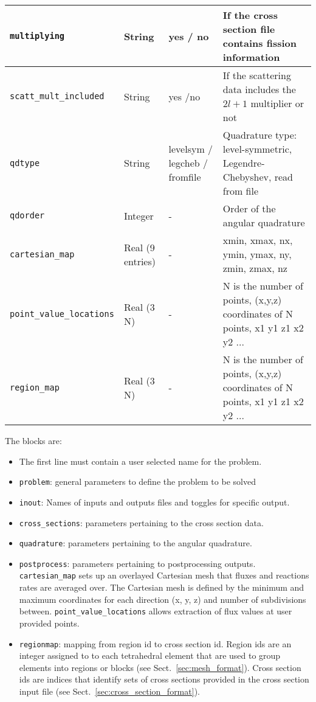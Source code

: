 \begin{longtable}[H]{l l l l}
    \verb"multiplying" & String & yes / no & If the cross section file contains fission information \\ \hline
    \verb"scatt_mult_included" & String & yes /no & If the scattering data includes the $2 l + 1$ multiplier or not \\ \hline
    \verb"qdtype" & String & levelsym / legcheb / fromfile & Quadrature type: level-symmetric, Legendre-Chebyshev, read from file \\ \hline
    \verb"qdorder" & Integer & - & Order of the angular quadrature \\ \hline
    \verb"cartesian_map" & Real (9 entries) & - & xmin, xmax, nx, ymin, ymax, ny, zmin, zmax, nz \\ \hline
    \verb"point_value_locations" & Real (3 N) & - & N is the number of points, (x,y,z) coordinates of N points, x1 y1 z1 x2 y2 ...  \\ \hline
    \verb"region_map" & Real (3 N) & - & N is the number of points, (x,y,z) coordinates of N points, x1 y1 z1 x2 y2 ...  \\
    \bottomrule
\end{longtable}

The blocks are:
\begin{itemize}
    \item The first line must contain a user selected name for the problem.
    \item \verb"problem": general parameters to define the problem to be solved
    \item \verb"inout": Names of inputs and outputs files and toggles for specific output.
    \item \verb"cross_sections": parameters pertaining to the cross section data.
    \item \verb"quadrature": parameters pertaining to the angular quadrature.
    \item \verb"postprocess": parameters pertaining to postprocessing outputs. \verb"cartesian_map" sets up an overlayed Cartesian mesh that fluxes and reactions rates are averaged over. The Cartesian mesh is defined by the minimum and maximum coordinates for each direction (x, y, z) and number of subdivisions between. \verb"point_value_locations" allows extraction of flux values at user provided points.
    \item \verb"regionmap": mapping from region id to cross section id. Region ids are an integer assigned to to each tetrahedral element that are used to group elements into regions or blocks (see Sect.~\ref{sec:mesh_format}). Cross section ids are indices that identify sets of cross sections provided in the cross section input file (see Sect.~\ref{sec:cross_section_format}).
\end{itemize}

